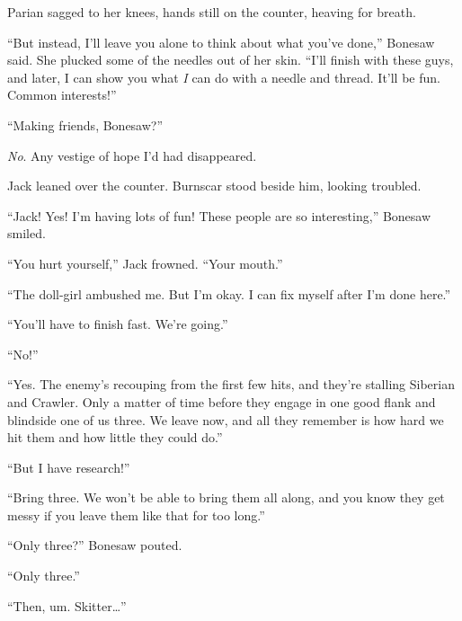 Parian sagged to her knees, hands still on the counter, heaving for breath.



``But instead, I'll leave you alone to think about what you've done,'' Bonesaw said.  She plucked some of the needles out of her skin.  ``I'll finish with these guys, and later, I can show you what \emph{I }can do with a needle and thread.  It'll be fun.  Common interests!''



``Making friends, Bonesaw?''



\emph{No}.  Any vestige of hope I'd had disappeared.



Jack leaned over the counter.  Burnscar stood beside him, looking troubled.



``Jack!  Yes!  I'm having lots of fun!  These people are so interesting,''  Bonesaw smiled.



``You hurt yourself,'' Jack frowned.  ``Your mouth.''



``The doll-girl ambushed me.  But I'm okay.  I can fix myself after I'm done here.''



``You'll have to finish fast.  We're going.''



``No!''



``Yes.  The enemy's recouping from the first few hits, and they're stalling Siberian and Crawler.  Only a matter of time before they engage in one good flank and blindside one of us three.  We leave now, and all they remember is how hard we hit them and how little they could do.''



``But I have research!''



``Bring three.  We won't be able to bring them all along, and you know they get messy if you leave them like that for too long.''



``Only three?''  Bonesaw pouted.



``Only three.''



``Then, um.  Skitter\ldots''



